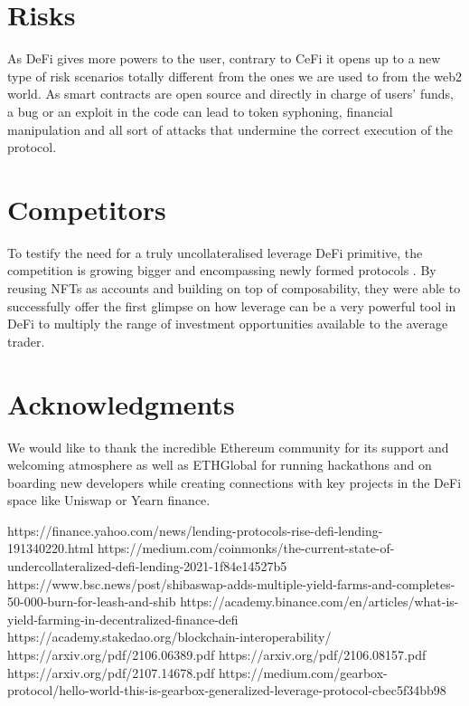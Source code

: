 \documentclass[a4paper,10 pt]{article}
\theoremstyle{definition}
\begin{document}
\section{Risks}
As DeFi gives more powers to the user, contrary to CeFi \cite{arxivCeFi} it opens up to a new type of risk scenarios \cite{arxivIntermediation} totally different from the ones we are used to from the web2 world. As smart contracts are open source and directly in charge of users' funds, a bug or an exploit in the code can lead to token syphoning, financial manipulation and all sort of attacks that undermine the correct execution of the protocol. 

\section{Competitors}
To testify the need for a truly uncollateralised leverage DeFi primitive, the competition is growing bigger and encompassing newly formed protocols \cite{mediumGearbox}. By reusing NFTs as accounts and building on top of composability, they were able to successfully offer the first glimpse on how leverage can be a very powerful tool in DeFi to multiply the range of investment opportunities available to the average trader.

\section{Acknowledgments}

We would like to thank the incredible Ethereum community for its support and welcoming atmosphere as well as ETHGlobal for running hackathons and on boarding new developers while creating connections with key projects in the DeFi space like Uniswap or Yearn finance.

\begin{thebibliography}{}
	
 https://finance.yahoo.com/news/lending-protocols-rise-defi-lending-191340220.html
 https://medium.com/coinmonks/the-current-state-of-undercollateralized-defi-lending-2021-1f84e14527b5
 https://www.bsc.news/post/shibaswap-adds-multiple-yield-farms-and-completes-50-000-burn-for-leash-and-shib
 https://academy.binance.com/en/articles/what-is-yield-farming-in-decentralized-finance-defi
 https://academy.stakedao.org/blockchain-interoperability/
 https://arxiv.org/pdf/2106.06389.pdf
 https://arxiv.org/pdf/2106.08157.pdf
 https://arxiv.org/pdf/2107.14678.pdf
 https://medium.com/gearbox-protocol/hello-world-this-is-gearbox-generalized-leverage-protocol-cbec5f34bb98

\end{thebibliography}
\end{document}
